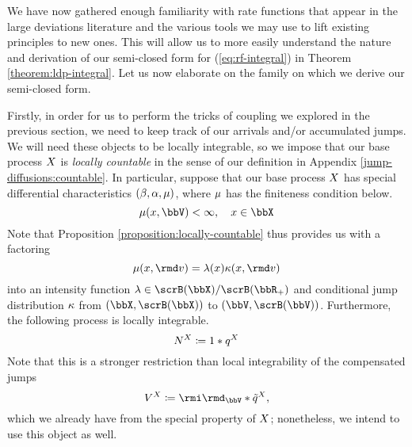 We have now gathered enough familiarity with rate functions that appear in the large deviations literature and the various tools we may use to lift existing principles to new ones.
This will allow us to more easily understand the nature and derivation of our semi-closed form for (\ref{eq:rf-integral}) in Theorem \ref{theorem:ldp-integral}.
Let us now elaborate on the family on which we derive our semi-closed form.

Firstly, in order for us to perform the tricks of coupling we explored in the previous section, we need to keep track of our arrivals and/or accumulated jumps.
We will need these objects to be locally integrable, so we impose that our base process $X$ is \emph{locally countable} in the sense of our definition in Appendix \ref{jump-diffusions:countable}.
In particular, suppose that our base process $X$ has special differential characteristics $(\beta, \alpha, \mu)$, where $\mu$ has the finiteness condition below.
\begin{equation}
  \label{eq:assumption-affJump-finite}
  \affJump(\stateVar, \vecSpace) < \infty, \quad \stateVar \in \stateSpace
\end{equation}
Note that Proposition \ref{proposition:locally-countable} thus provides us with a factoring 
\begin{equation}
  \label{eq:affJump-factoring}
  \affJump(\stateVar,\rmd\markVar) = \affInt(\stateVar) \affDist(\stateVar, \rmd\markVar)
\end{equation}
into an intensity function $\affInt \in \scrB(\stateSpace)/\scrB(\bbR_+)$ and conditional jump distribution $\kappa$ from $(\stateSpace, \scrB(\stateSpace))$ to $(\vecSpace, \scrB(\vecSpace))$.
Furthermore, the following process is locally integrable.
\begin{equation}
  \label{eq:arrivals}
  N^X \coloneqq 1 \ast q^X
\end{equation}
Note that this is a stronger restriction than local integrability of the compensated jumps
\begin{equation}
  \label{eq:jumps}
  \V^\X \defeq \id_\vecSpace \ast \compensate{\jumpMeas^\X},
\end{equation}
which we already have from the special property of $X$; nonetheless, we intend to use this object as well.



